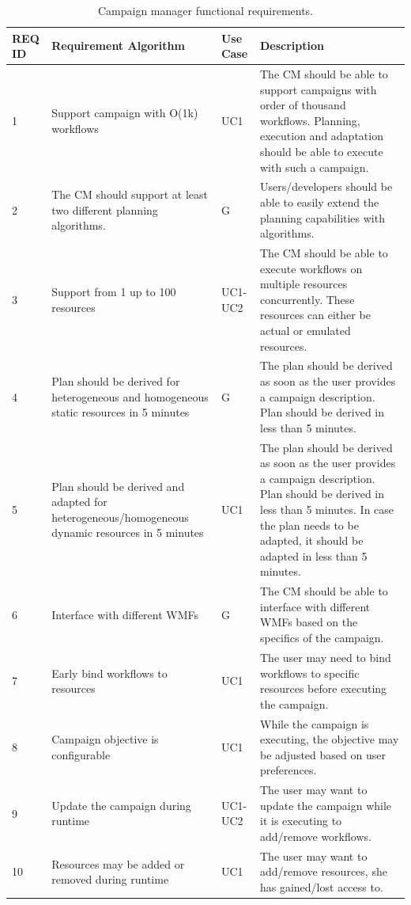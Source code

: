 \begin{table}[t]
    \centering
    \scriptsize
    \begin{tabular}{@{}p{1.5cm}|p{2.8cm}p{1.5cm}p{6cm}@{}}
        \toprule
        \textbf{REQ ID} &\textbf{Requirement Algorithm} &\textbf{Use Case} & \textbf{Description} \\
        \midrule
         1 & 
         Support campaign with O(1k) workflows & 
         UC1 & 
         The CM should be able to support campaigns with order of thousand workflows.
         Planning, execution and adaptation should be able to execute with such a campaign.\\
         2 & 
         The CM should support at least two different planning algorithms. & 
         G & 
         Users/developers should be able to easily extend the planning capabilities with algorithms.\\
         3 & 
         Support from 1 up to 100 resources & 
         UC1-UC2 & 
         The CM should be able to execute workflows on multiple resources concurrently.
         These resources can either be actual or emulated resources.\\
         4 & 
         Plan should be derived for heterogeneous and homogeneous static resources in 5 minutes & 
         G & 
         The plan should be derived as soon as the user provides a campaign description. 
         Plan should be derived in less than 5 minutes.\\
         5 & 
         Plan should be derived and adapted for heterogeneous/homogeneous dynamic resources in 5 minutes & 
         UC1 & 
         The plan should be derived as soon as the user provides a campaign description.
         Plan should be derived in less than 5 minutes.
         In case the plan needs to be adapted, it should be adapted in less than 5 minutes.\\
         6 & 
         Interface with different WMFs & 
         G & 
         The CM should be able to interface with different WMFs based on the specifics of the campaign. \\
         7 & 
         Early bind workflows to resources &
         UC1 &
         The user may need to bind workflows to specific resources before executing the campaign.\\
         8 & 
         Campaign objective is configurable & 
         UC1 & 
         While the campaign is executing, the objective may be adjusted based on user preferences.\\
         9 &
         Update the campaign during runtime &
         UC1-UC2 &
         The user may want to update the campaign while it is executing to add/remove workflows.\\
         10 &
         Resources may be added or removed during runtime & 
         UC1 & 
         The user may want to add/remove resources, she has gained/lost access to.\\
        \bottomrule
    \end{tabular}
    \caption{Campaign manager functional requirements.\label{tab:fun_reqs}}
\end{table}

